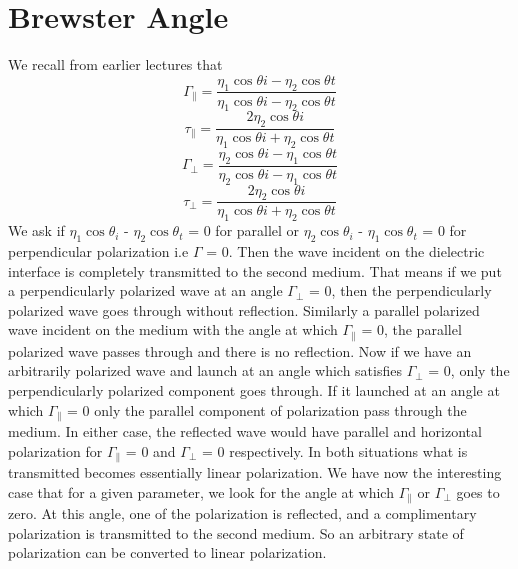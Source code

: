 \section{Brewster Angle}
We recall from earlier lectures that 
\begin{equation}
\Gamma_\parallel = \dfrac{\eta_1\cos\textit{$\theta$i} - \eta_2\cos\textit{$\theta$t}}  {\eta_1\cos\textit{$\theta$i} - \eta_2\cos\textit{$\theta$t}}
\end{equation}
\begin{equation}
\tau_\parallel = \dfrac{2\eta_2\cos\textit{$\theta$i}} {\eta_1\cos\textit{$\theta$i} + \eta_2\cos\textit{$\theta$t}}
\end{equation}
\begin{equation}
\Gamma_\perp = \dfrac{\eta_2\cos\textit{$\theta$i} - \eta_1\cos\textit{$\theta$t}}  {\eta_2\cos\textit{$\theta$i} - \eta_1\cos\textit{$\theta$t}}
\end{equation}
\begin{equation}
\tau_\perp = \dfrac{2\eta_2\cos\textit{$\theta$i}} {\eta_1\cos\textit{$\theta$i} + \eta_2\cos\textit{$\theta$t}}
\end{equation}
We ask if $\eta_1\cos\theta_{\textit{i}}$ - $\eta_2\cos\theta_{\textit{t}}$ = 0  for parallel or $\eta_2\cos\theta_{\textit{i}}$ - $\eta_1\cos\theta_{\textit{t}}$ = 0 for perpendicular polarization i.e $\Gamma$ = 0. Then the wave incident on the dielectric interface is completely transmitted to the second medium. That means if we put a perpendicularly polarized wave at an angle $\Gamma_\perp$ = 0, then the perpendicularly polarized wave goes through without reflection. Similarly a parallel polarized wave incident on the medium with the angle at which $\Gamma_{\parallel}$ = 0, the parallel polarized wave passes through and there is no reflection.
Now if we have an arbitrarily polarized wave and launch at an angle which satisfies $\Gamma_\perp$ = 0, only the perpendicularly polarized component goes through. If it launched at an angle at which $\Gamma_\parallel$ = 0 only the parallel component of polarization pass through the medium. In either case, the reflected wave would have parallel and horizontal polarization for $\Gamma_\parallel$ = 0 and $\Gamma_\perp$ = 0 respectively. In both situations what is transmitted becomes essentially linear polarization. We have now the interesting case that for a given parameter, we look for the angle at which $\Gamma_\parallel$ or $\Gamma_\perp$ goes to zero. At this angle, one of the polarization is reflected, and a complimentary polarization is transmitted to the second medium. So an arbitrary state of polarization can be converted to linear polarization.

